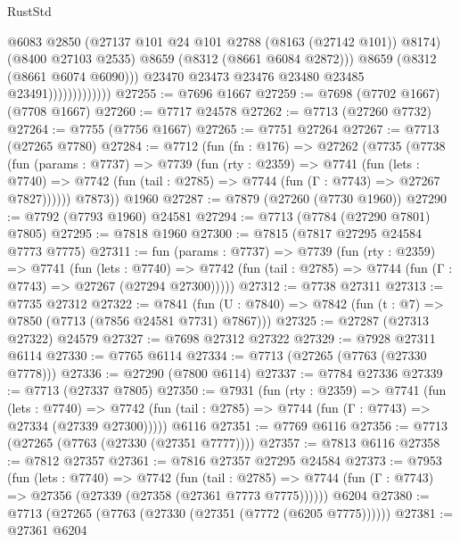 \begin{lexlean}{RustStd}
\begin{coremodule}
                                  @6083
                                  @2850
                                  (@27137 @101 @24 @101 @2788 (@8163 (@27142 @101)) @8174)
                                  (@8400 @27103 @2535)
                                  @8659
                                  (@8312 (@8661 @6084 @2872)))
                                @8659
                                (@8312 (@8661 @6074 @6090)))
                              @23470
                              @23473
                              @23476
                              @23480
                              @23485
                              @23491)))))))))))))
@27255 := @7696 @1667
@27259 := @7698 (@7702 @1667) (@7708 @1667)
@27260 := @7717 @24578
@27262 := @7713 (@27260 @7732)
@27264 := @7755 (@7756 @1667)
@27265 := @7751 @27264
@27267 := @7713 (@27265 @7780)
@27284 := @7712
    (fun (fn : @176) =>
    @27262
      (@7735
        (@7738
          (fun (params : @7737) =>
          @7739
            (fun (rty : @2359) =>
            @7741
              (fun (lets : @7740) =>
              @7742 (fun (tail : @2785) => @7744 (fun (Γ : @7743) => @27267 @7827))))))
        @7873))
    @1960
@27287 := @7879 (@27260 (@7730 @1960))
@27290 := @7792 (@7793 @1960) @24581
@27294 := @7713 (@7784 (@27290 @7801) @7805)
@27295 := @7818 @1960
@27300 := @7815 (@7817 @27295 @24584 @7773 @7775)
@27311 := fun (params : @7737) =>
  @7739
    (fun (rty : @2359) =>
    @7741
      (fun (lets : @7740) =>
      @7742 (fun (tail : @2785) => @7744 (fun (Γ : @7743) => @27267 (@27294 @27300)))))
@27312 := @7738 @27311
@27313 := @7735 @27312
@27322 := @7841
    (fun (U : @7840) => @7842 (fun (t : @7) => @7850 (@7713 (@7856 @24581 @7731) @7867)))
@27325 := @27287 (@27313 @27322) @24579
@27327 := @7698 @27312 @27322
@27329 := @7928 @27311 @6114
@27330 := @7765 @6114
@27334 := @7713 (@27265 (@7763 (@27330 @7778)))
@27336 := @27290 (@7800 @6114)
@27337 := @7784 @27336
@27339 := @7713 (@27337 @7805)
@27350 := @7931
    (fun (rty : @2359) =>
    @7741
      (fun (lets : @7740) =>
      @7742 (fun (tail : @2785) => @7744 (fun (Γ : @7743) => @27334 (@27339 @27300)))))
    @6116
@27351 := @7769 @6116
@27356 := @7713 (@27265 (@7763 (@27330 (@27351 @7777))))
@27357 := @7813 @6116
@27358 := @7812 @27357
@27361 := @7816 @27357 @27295 @24584
@27373 := @7953
    (fun (lets : @7740) =>
    @7742
      (fun (tail : @2785) =>
      @7744 (fun (Γ : @7743) => @27356 (@27339 (@27358 (@27361 @7773 @7775))))))
    @6204
@27380 := @7713 (@27265 (@7763 (@27330 (@27351 (@7772 (@6205 @7775))))))
@27381 := @27361 @6204

\end{coremodule}
\end{lexlean}
